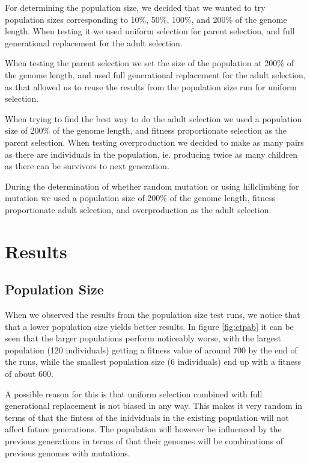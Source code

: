 For determining the population size, we decided that we wanted to try population sizes corresponding to 10\%, 50\%, 100\%, and 200\% of the genome length. When testing it we used uniform selection for parent selection, and full generational replacement for the adult selection.

When testing the parent selection we set the size of the population at 200\% of the genome length, and used full generational replacement for the adult selection, as that allowed us to reuse the results from the population size run for uniform selection.

When trying to find the best way to do the adult selection we used a population size of 200\% of the genome length, and fitness proportionate selection as the parent selection. When testing overproduction we decided to make as many pairs as there are individuals in the population, ie. producing twice as many children as there can be survivors to next generation.

During the determination of whether random mutation or using hillclimbing for mutation we used a population size of 200\% of the genome length, fitness proportionate adult selection, and overproduction as the adult selection.


\clearpage

\section{Results} %
\label{sec:results}

\subsection{Population Size} %
\label{sub:population_size}

When we observed the results from the population size test runs, we notice that that a lower population size yields better results. In figure \ref{fig:ctpab} it can be seen that the larger populations perform noticeably worse, with the largest population (120 individuals) getting a fitness value of around 700 by the end of the runs, while the smallest population size (6 individuals) end up with a fitness of about 600.

A possible reason for this is that uniform selection combined with full generational replacement is not biased in any way. This makes it very random in terms of that the fintess of the inidviduals in the existing population will not affect future generations. The population will however be influenced by the previous generations in terms of that their genomes will be combinations of previous genomes with mutations.

